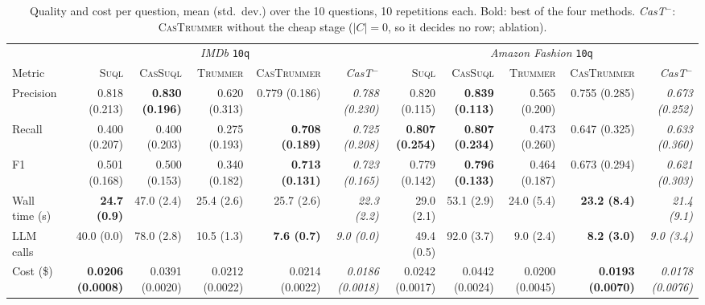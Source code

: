 \documentclass[sigconf]{acmart}
\begin{document}
\begin{table}[t]
\centering\scriptsize
\setlength{\tabcolsep}{3pt}
\begin{tabular}{l rrrrr rrrrr}
\toprule
 & \multicolumn{5}{c}{\textit{IMDb} \texttt{10q}} & \multicolumn{5}{c}{\textit{Amazon Fashion} \texttt{10q}} \\
\cmidrule(lr){2-6}\cmidrule(lr){7-11}
Metric & \textsc{Suql} & \textsc{CasSuql} & \textsc{Trummer} & \textsc{CasTrummer} & \textit{CasT$^{-}$} & \textsc{Suql} & \textsc{CasSuql} & \textsc{Trummer} & \textsc{CasTrummer} & \textit{CasT$^{-}$} \\
\midrule
Precision & 0.818 (0.213) & \textbf{0.830 (0.196)} & 0.620 (0.313) & 0.779 (0.186) & \textit{0.788 (0.230)} & 0.820 (0.115) & \textbf{0.839 (0.113)} & 0.565 (0.200) & 0.755 (0.285) & \textit{0.673 (0.252)} \\
Recall & 0.400 (0.207) & 0.400 (0.203) & 0.275 (0.193) & \textbf{0.708 (0.189)} & \textit{0.725 (0.208)} & \textbf{0.807 (0.254)} & \textbf{0.807 (0.234)} & 0.473 (0.260) & 0.647 (0.325) & \textit{0.633 (0.360)} \\
F1 & 0.501 (0.168) & 0.500 (0.153) & 0.340 (0.182) & \textbf{0.713 (0.131)} & \textit{0.723 (0.165)} & 0.779 (0.142) & \textbf{0.796 (0.133)} & 0.464 (0.187) & 0.673 (0.294) & \textit{0.621 (0.303)} \\
Wall time (s) & \textbf{24.7 (0.9)} & 47.0 (2.4) & 25.4 (2.6) & 25.7 (2.6) & \textit{22.3 (2.2)} & 29.0 (2.1) & 53.1 (2.9) & 24.0 (5.4) & \textbf{23.2 (8.4)} & \textit{21.4 (9.1)} \\
LLM calls & 40.0 (0.0) & 78.0 (2.8) & 10.5 (1.3) & \textbf{7.6 (0.7)} & \textit{9.0 (0.0)} & 49.4 (0.5) & 92.0 (3.7) & 9.0 (2.4) & \textbf{8.2 (3.0)} & \textit{9.0 (3.4)} \\
Cost (\$) & \textbf{0.0206 (0.0008)} & 0.0391 (0.0020) & 0.0212 (0.0022) & 0.0214 (0.0022) & \textit{0.0186 (0.0018)} & 0.0242 (0.0017) & 0.0442 (0.0024) & 0.0200 (0.0045) & \textbf{0.0193 (0.0070)} & \textit{0.0178 (0.0076)} \\
\bottomrule
\end{tabular}
\caption{Quality and cost per question, mean (std.\ dev.) over the 10 questions, 10 repetitions each. Bold: best of the four methods. \textit{CasT$^{-}$}: \textsc{CasTrummer} without the cheap stage ($|C|{=}0$, so it decides no row; ablation).}
\label{tab:results}
\end{table}
\end{document}
